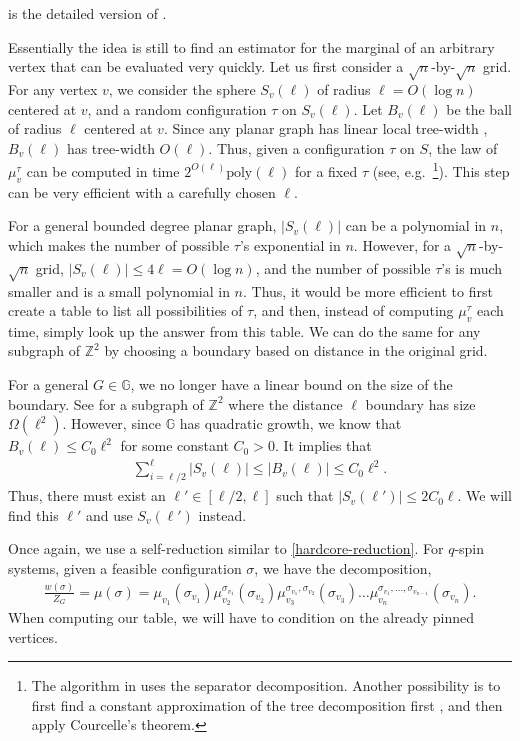 \documentclass[10pt,a4paper]{article}
\def\=#1{\mathbb{#1}}
\newcommand{\abs}[1]{\ensuremath{\left\vert#1\right\vert}}
\begin{document}
 is the detailed version of .

Essentially the idea is still to find an estimator for the marginal of an arbitrary vertex that can be evaluated very quickly.
Let us first consider a $\sqrt{n}$-by-$\sqrt{n}$ grid.
For any vertex $v$, we consider the sphere $S_v(\ell)$ of radius $\ell=O(\log n)$ centered at $v$,
and a random configuration $\tau$ on $S_v(\ell)$.
Let $B_v(\ell)$ be the ball of radius $\ell$ centered at $v$.
Since any planar graph has linear local tree-width \cite{DH04,Epp00},
$B_v(\ell)$ has tree-width $O(\ell)$.
Thus, given a configuration $\tau$ on $S$, 
the law of $\mu_v^{\tau}$ can be computed in time $2^{O(\ell)}\textrm{poly}(\ell)$ for a fixed $\tau$ (see, e.g.~\cite{YZ13}\footnote{The algorithm in \cite{YZ13} uses the separator decomposition. Another possibility is to first find a constant approximation of the tree decomposition first \cite{KT16}, and then apply Courcelle's theorem.}).
This step can be very efficient with a carefully chosen $\ell$.

For a general bounded degree planar graph, $\abs{S_v(\ell)}$ can be a polynomial in $n$, which makes the number of possible $\tau$'s exponential in $n$.
However, for a $\sqrt{n}$-by-$\sqrt{n}$ grid, $\abs{S_v(\ell)}\le 4\ell=O(\log n)$,
and the number of possible $\tau$'s is much smaller and is a small polynomial in $n$.
Thus, it would be more efficient to first create a table to list all possibilities of $\tau$,
and then, instead of computing $\mu_v^{\tau}$ each time,
 simply look up the answer from this table. We can do the same for any subgraph of $\mathbb{Z}^2$ by choosing a boundary based on distance in the original grid. 

For a general $G\in\=G$,
we no longer have a linear bound on the size of the boundary.
See  for a subgraph of $\=Z^2$ where the distance $\ell$ boundary has size $\Omega(\ell^2)$.
However, since $\=G$ has quadratic growth,
we know that $B_v(\ell)\le C_0\ell^2$ for some constant $C_0>0$.
It implies that 
\begin{align*}
  \sum_{i=\ell/2}^{\ell}\abs{S_v(\ell)}\le\abs{B_v(\ell)} \le C_0\ell^2.
\end{align*}
Thus, there must exist an $\ell'\in[\ell/2,\ell]$ such that $\abs{S_v(\ell')}\le 2C_0\ell$.
We will find this $\ell'$ and use $S_v(\ell')$ instead.


Once again, we use a self-reduction similar to \eqref{hardcore-reduction}. For $q$-spin systems, given a feasible configuration $\sigma$, we have the decomposition,
\begin{align}
	\label{q-spin-decomposition}
	\frac{w(\sigma)}{Z_G}=\mu(\sigma)=\mu_{v_1}(\sigma_{v_1})\mu_{v_2}^{\sigma_{v_1}}(\sigma_{v_2})\mu_{v_3}^{\sigma_{v_1},\sigma_{v_2}}(\sigma_{v_3})\ldots\mu_{v_n}^{\sigma_{v_1},\ldots,\sigma_{v_{n-1}}}(\sigma_{v_n}).
\end{align}
When computing our table, we will have to condition on the already pinned vertices. 
\end{document}

